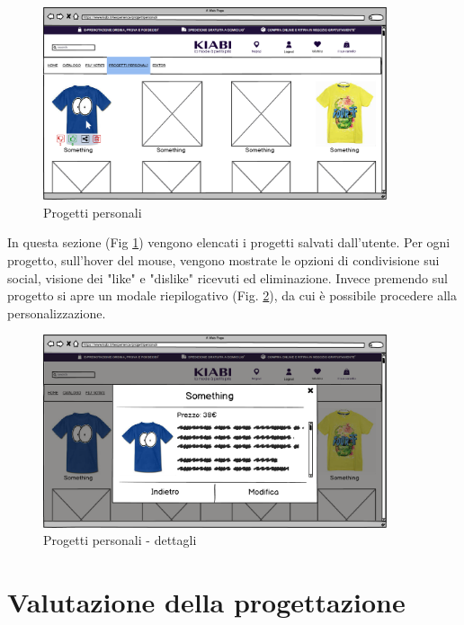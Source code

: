 \documentclass[12pt,italian,]{report}
\begin{document}
\begin{figure}[h]
\centering
\includegraphics[width=0.9\textwidth]{../balsamiq/balsamiq_finale/ProgettiPersonali.png}
\caption{Progetti personali}
\label{prog-pers}
\end{figure}

In questa sezione (Fig \ref{prog-pers}) vengono elencati i progetti salvati dall'utente. Per ogni progetto, sull'hover del mouse, vengono mostrate le opzioni di condivisione sui social, visione dei "like" e "dislike" ricevuti ed eliminazione. Invece premendo sul progetto si apre un modale riepilogativo (Fig. \ref{prog-pers-dett}), da cui è possibile procedere alla personalizzazione.

\begin{figure}[h]
\centering
\includegraphics[width=0.9\textwidth]{../balsamiq/balsamiq_finale/ProgettiPersonalidetails.png}
\caption{Progetti personali - dettagli}
\label{prog-pers-dett}
\end{figure}

\newpage
\hypertarget{valutazione-della-progettazione}{%
\chapter{Valutazione della
progettazione}\label{valutazione-della-progettazione}}
\end{document}
